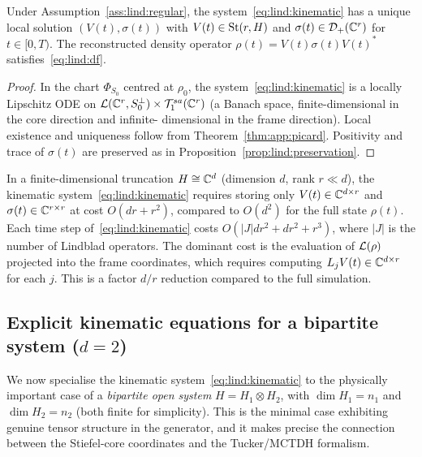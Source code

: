 \begin{proposition}
\label{prop:lind:kinematic_wellposed}
Under Assumption~\ref{ass:lind:regular}, the system~\eqref{eq:lind:kinematic}
has a unique local solution $(V(t), \sigma(t))$ with
$V(t) \in \mathrm{St}(r,H)$ and $\sigma(t) \in \mathcal{D}_+(\mathbb{C}^r)$ for
$t \in [0, T)$. The reconstructed density operator
$\rho(t) = V(t)\sigma(t)V(t)^*$ satisfies~\eqref{eq:lind:df}.
\end{proposition}

\begin{proof}
In the chart $\Phi_{S_0}$ centred at $\rho_0$, the system~\eqref{eq:lind:kinematic}
is a locally Lipschitz ODE on
$\mathcal{L}(\mathbb{C}^r, S_0^\perp) \times \mathcal{T}_{1}^{sa}(\mathbb{C}^r)$
(a Banach space, finite-dimensional in the core direction and infinite-
dimensional in the frame direction). Local existence and uniqueness
follow from Theorem~\ref{thm:app:picard}. Positivity and trace of $\sigma(t)$
are preserved as in Proposition~\ref{prop:lind:preservation}.
\end{proof}

\begin{remark}
\label{rem:lind:complexity}
In a finite-dimensional truncation $H \cong \mathbb{C}^d$ (dimension $d$,
rank $r \ll d$), the kinematic system~\eqref{eq:lind:kinematic}
requires storing only $V(t) \in \mathbb{C}^{d \times r}$ and $\sigma(t) \in
\mathbb{C}^{r \times r}$ at cost $O(dr + r^2)$, compared to $O(d^2)$ for the
full state $\rho(t)$. Each time step of~\eqref{eq:lind:kinematic}
costs $O(|J|dr^2 + dr^2 + r^3)$, where $|J|$ is the number of Lindblad
operators. The dominant cost is the evaluation of $\mathcal{L}(\rho)$
projected into the frame coordinates, which requires computing
$L_j V(t) \in \mathbb{C}^{d \times r}$ for each $j$. This is a factor
$d/r$ reduction compared to the full simulation.
\end{remark}

\subsection*{Explicit kinematic equations for a bipartite system ($d=2$)}

We now specialise the kinematic system~\eqref{eq:lind:kinematic} to the
physically important case of a \emph{bipartite open system}
$H = H_1 \otimes H_2$, with $\dim H_1 = n_1$ and $\dim H_2 = n_2$
(both finite for simplicity). This is the minimal case exhibiting
genuine tensor structure in the generator, and it makes precise the
connection between the Stiefel-core coordinates and the Tucker/MCTDH
formalism.

